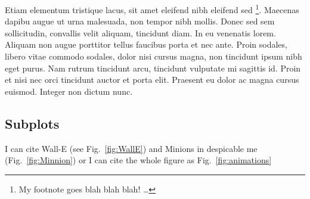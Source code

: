 Etiam elementum tristique lacus, sit amet eleifend nibh eleifend sed \footnote{My footnote goes blah blah blah! \dots}. Maecenas dapibu augue ut urna malesuada, non tempor nibh mollis. Donec sed sem sollicitudin, convallis velit aliquam, tincidunt diam. In eu venenatis lorem. Aliquam non augue porttitor tellus faucibus porta et nec ante. Proin sodales, libero vitae commodo sodales, dolor nisi cursus magna, non tincidunt ipsum nibh eget purus. Nam rutrum tincidunt arcu, tincidunt vulputate mi sagittis id. Proin et nisi nec orci tincidunt auctor et porta elit. Praesent eu dolor ac magna cursus euismod. Integer non dictum nunc.


\begin{landscape}

\section*{Subplots}
I can cite Wall-E (see Fig.~\ref{fig:WallE}) and Minions in despicable me (Fig.~\ref{fig:Minnion}) or I can cite the whole figure as Fig.~\ref{fig:animations}



\end{landscape}
